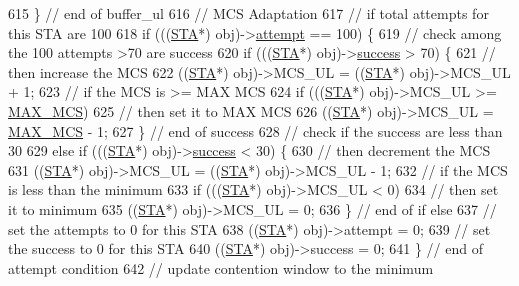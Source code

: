 \begin{DoxyCode}
615             \} \textcolor{comment}{// end of buffer\_ul}
616               \textcolor{comment}{// MCS Adaptation}
617               \textcolor{comment}{// if total attempts for this STA are 100}
618             \textcolor{keywordflow}{if} (((\hyperlink{classSTA}{STA}*) obj)->\hyperlink{classAP_aa15c857fb5fb5d7688f1ee49d43a2aee}{attempt} == 100) \{
619                 \textcolor{comment}{// check among the 100 attempts >70 are success}
620                 \textcolor{keywordflow}{if} (((\hyperlink{classSTA}{STA}*) obj)->\hyperlink{classAP_aa9d8130f487d3ba13dc6b22fe5e3868d}{success} > 70) \{
621                     \textcolor{comment}{// then increase the MCS}
622                     ((\hyperlink{classSTA}{STA}*) obj)->MCS\_UL = ((\hyperlink{classSTA}{STA}*) obj)->MCS\_UL + 1;
623                     \textcolor{comment}{// if the MCS is >= MAX MCS}
624                     \textcolor{keywordflow}{if} (((\hyperlink{classSTA}{STA}*) obj)->MCS\_UL >= \hyperlink{classAP_a1fe0d98f0db9557f18e560f8bc96c2fc}{MAX\_MCS})
625                         \textcolor{comment}{// then set it to MAX MCS}
626                         ((\hyperlink{classSTA}{STA}*) obj)->MCS\_UL = \hyperlink{classAP_a1fe0d98f0db9557f18e560f8bc96c2fc}{MAX\_MCS} - 1;
627                 \} \textcolor{comment}{// end of success}
628                   \textcolor{comment}{// check if the success are less than 30%
629                 \textcolor{keywordflow}{else} \textcolor{keywordflow}{if} (((\hyperlink{classSTA}{STA}*) obj)->\hyperlink{classAP_aa9d8130f487d3ba13dc6b22fe5e3868d}{success} < 30) \{
630                     \textcolor{comment}{// then decrement the MCS}
631                     ((\hyperlink{classSTA}{STA}*) obj)->MCS\_UL = ((\hyperlink{classSTA}{STA}*) obj)->MCS\_UL - 1;
632                     \textcolor{comment}{// if the MCS is less than the minimum}
633                     \textcolor{keywordflow}{if} (((\hyperlink{classSTA}{STA}*) obj)->MCS\_UL < 0)
634                         \textcolor{comment}{// then set it to minimum}
635                         ((\hyperlink{classSTA}{STA}*) obj)->MCS\_UL = 0;
636                 \} \textcolor{comment}{// end of if else}
637                   \textcolor{comment}{// set the attempts to 0 for this STA}
638                 ((\hyperlink{classSTA}{STA}*) obj)->attempt = 0;
639                 \textcolor{comment}{// set the success to 0 for this STA}
640                 ((\hyperlink{classSTA}{STA}*) obj)->success = 0;
641             \} \textcolor{comment}{// end of attempt condition}
642               \textcolor{comment}{// update contention window to the minimum}
}
\end{DoxyCode}
